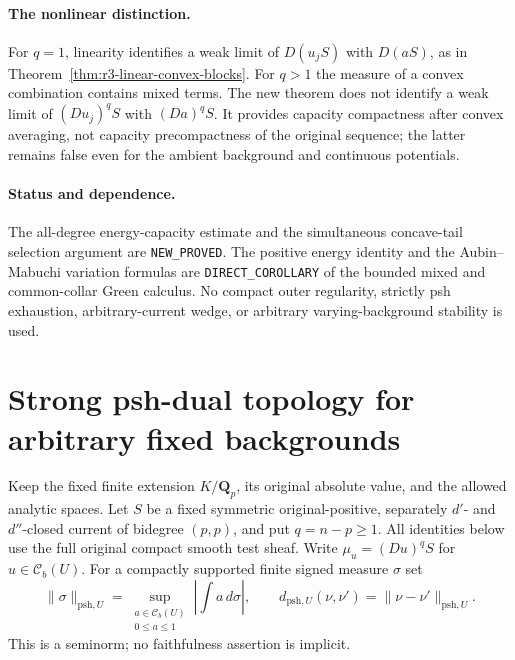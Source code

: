 \documentclass[11pt,a4paper]{article}
\numberwithin{equation}{section}
\theoremstyle{definition}
\theoremstyle{remark}
\begin{document}
\paragraph{The nonlinear distinction.}
For $q=1$, linearity identifies a weak limit of $D(u_jS)$
with $D(aS)$, as in Theorem~\ref{thm:r3-linear-convex-blocks}.
For $q>1$ the measure of a convex combination contains mixed
terms. The new theorem does not identify a weak limit of
$(Du_j)^qS$ with $(Da)^qS$. It provides capacity compactness
after convex averaging, not capacity precompactness of the
original sequence; the latter remains false even for the
ambient background and continuous potentials.

\paragraph{Status and dependence.}
The all-degree energy-capacity estimate and the simultaneous
concave-tail selection argument are \texttt{NEW\_PROVED}.
The positive energy identity and the Aubin--Mabuchi variation
formulas are \texttt{DIRECT\_COROLLARY} of the bounded mixed
and common-collar Green calculus. No compact outer regularity,
strictly psh exhaustion, arbitrary-current wedge, or arbitrary
varying-background stability is used.




\section{Strong psh-dual topology for arbitrary fixed backgrounds}
\label{sec:r3-strong-relative-topology}

Keep the fixed finite extension $K/\mathbf Q_p$, its original
absolute value, and the allowed analytic spaces. Let $S$ be a
fixed symmetric original-positive, separately $d'$- and
$d''$-closed current of bidegree $(p,p)$, and put $q=n-p\geq1$.
All identities below use the full original compact smooth test
sheaf. Write $\mu_u=(Du)^qS$ for $u\in\mathcal C_b(U)$.
For a compactly supported finite signed measure $\sigma$ set
\[
 \|\sigma\|_{\mathrm{psh},U}
 =\sup_{\substack{a\in\mathcal C_b(U)\\0\leq a\leq1}}
          \left|\int a\,d\sigma\right|,
 \qquad
 d_{\mathrm{psh},U}(\nu,\nu')
       =\|\nu-\nu'\|_{\mathrm{psh},U}.
\]
This is a seminorm; no faithfulness assertion is implicit.
\end{document}
